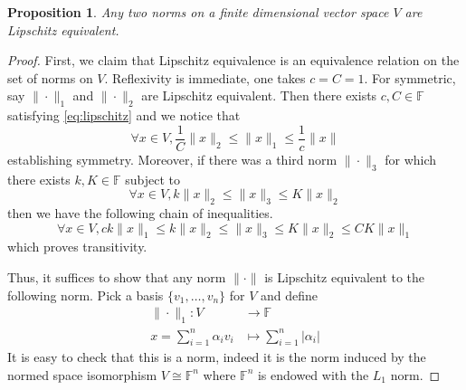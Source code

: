\documentclass[12pt]{article}
\theoremstyle{plain}
\newtheorem{proposition}[thm]{Proposition}
\theoremstyle{definition}
\newcommand{\bb}[1]{\mathbb{#1}}
\newcommand{\lto}{\longrightarrow}
\begin{document}
	\begin{proposition}\label{prop:all_norms_equiv}
		Any two norms on a finite dimensional vector space $V$ are Lipschitz equivalent.
		\end{proposition}
	\begin{proof}
		First, we claim that Lipschitz equivalence is an equivalence relation on the set of norms on $V$. Reflexivity is immediate, one takes $c = C = 1$. For symmetric, say $\| \cdot \|_1$ and $\| \cdot \|_2$ are Lipschitz equivalent. Then there exists $c,C \in \bb{F}$ satisfying \eqref{eq:lipschitz} and we notice that
		\begin{equation}
			\forall x \in V, \frac{1}{C}\| x \|_2 \leq \| x \|_1 \leq \frac{1}{c}\| x \|
			\end{equation}
		establishing symmetry. Moreover, if there was a third norm $\| \cdot \|_3$ for which there exists $k, K \in \bb{F}$ subject to
		\begin{equation}
			\forall x \in V, k\| x \|_2 \leq \| x \|_3 \leq K\| x \|_2
			\end{equation}
		then we have the following chain of inequalities.
		\begin{equation}
			\forall x \in V, ck \|x\|_1 \leq k \| x \|_2 \leq \| x \|_3 \leq K \| x \|_2 \leq CK \| x \|_1
			\end{equation}
		which proves transitivity.
		
		Thus, it suffices to show that any norm $\| \cdot \|$ is Lipschitz equivalent to the following norm. Pick a basis $\{ v_1, \ldots, v_n \}$ for $V$ and define
		\begin{align}
			\| \cdot \|_1 : V &\lto \bb{F}\\
			x = \sum_{i = 1}^n \alpha_i v_i &\longmapsto \sum_{i = 1}^n |\alpha_i|
			\end{align}
		It is easy to check that this is a norm, indeed it is the norm induced by the normed space isomorphism $V \cong \bb{F}^n$ where $\bb{F}^n$ is endowed with the $L_1$ norm.
		

\end{proof}
\end{document}
